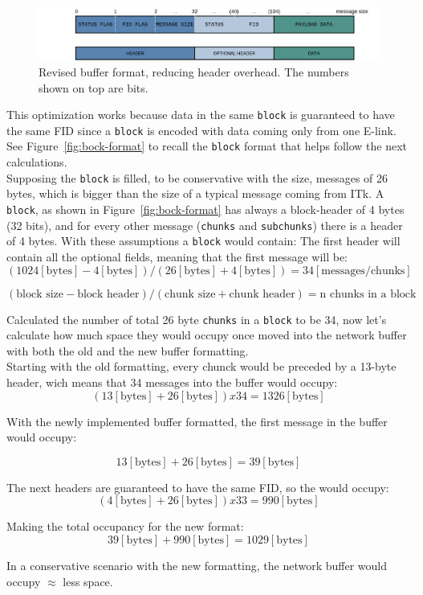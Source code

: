 \begin{figure}[htbp]
\centering
\includegraphics[width=\textwidth]{images/contributions/new-buffer-format.png}
\caption[New network buffer format]{Revised buffer format, reducing header overhead. The numbers shown on top are bits.}
\label{fig:new-buffer-format}
\end{figure}

This optimization works because data in the same \texttt{block} is guaranteed to have the same \acs{FID} since a \texttt{block} is encoded with data coming only from one \acs{E-link}.\\
See Figure~\ref{fig:bock-format} to recall the \texttt{block} format that helps follow the next calculations.\\
Supposing the \texttt{block} is filled, to be conservative with the size, messages of 26 bytes, which is bigger than the size of a typical message coming from \acs{ITk}. A \texttt{block}, as shown in Figure~\ref{fig:bock-format} has always a block-header of 4 bytes (32 bits), and for every other message (\texttt{chunks} and \texttt{subchunks}) there is a header of 4 bytes. With these assumptions a \texttt{block} would contain:
The first header will contain all the optional fields, meaning that the first message will be:
\[
(1024 [\text{bytes}] - 4 [\text{bytes}]) / (26 [\text{bytes}] + 4 [\text{bytes}]) =   34 [\text{messages/chunks}]
\]

\[
(\text{block size} - \text{block header}) / (\text{chunk size} + \text{chunk header}) =   \text{n chunks in a block}
\]

Calculated the number of total 26 byte \texttt{chunks} in a \texttt{block} to be 34, now let's calculate how much space they would occupy once moved into the network buffer with both the old and the new buffer formatting.\\
Starting with the old formatting, every chunck would be preceded by a 13-byte header, wich means that 34 messages into the buffer would occupy:
\[
(13 [\text{bytes}] + 26 [\text{bytes}]) x 34 = 1326 [\text{bytes}]
\]

With the newly implemented buffer formatted, the first message in the buffer would occupy:

\[
13 [\text{bytes}] + 26 [\text{bytes}] = 39 [\text{bytes}]
\]

The next headers are guaranteed to have the same \acs{FID}, so the would occupy:
\[
(4 [\text{bytes}] + 26 [\text{bytes}]) x 33 = 990 [\text{bytes}]
\]

Making the total occupancy for the new format:
\[
39 [\text{bytes}] + 990 [\text{bytes}] = 1029 [\text{bytes}]
\]

In a conservative scenario with the new formatting, the network buffer would occupy $\approx$ less space.